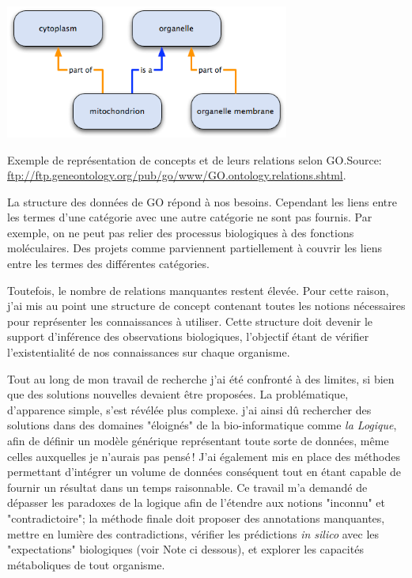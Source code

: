 \begin{refsegment}
\begin{shadedfigure}[H]
    \centering
    \includegraphics[width=0.7\textwidth]{img/dag_go_relation.png}
    \caption{Exemple de représentation de concepts et de leurs relations selon \gls{GO}.\hspace{\textwidth}\tiny{Source: \url{ftp://ftp.geneontology.org/pub/go/www/GO.ontology.relations.shtml}.}}
    \label{fig:go_relation}
\end{shadedfigure}


La structure des données de \gls{GO} répond à nos besoins. Cependant les liens entre les termes d'une catégorie avec une autre catégorie ne sont pas fournis. Par exemple, on ne peut pas relier des processus biologiques à des fonctions moléculaires. Des projets comme \cite{AdditionalGO2006} parviennent partiellement à couvrir les liens  entre les termes des différentes catégories.

Toutefois, le nombre de relations manquantes restent élevée. Pour cette raison, j'ai mis au point une structure de concept contenant toutes les notions nécessaires pour représenter les connaissances à utiliser. Cette structure doit devenir le support d'inférence des observations biologiques, l'objectif étant de vérifier l'existentialité de nos connaissances sur chaque organisme.

Tout au long de mon travail de recherche j'ai été confronté à des limites, si bien que des solutions nouvelles devaient être proposées. La problématique, d'apparence simple, s'est révélée plus complexe. j'ai ainsi dû rechercher des solutions dans des domaines "éloignés" de la bio-informatique comme \textit{la Logique}, afin de définir un modèle générique représentant toute sorte de données, même celles auxquelles je n'aurais pas pensé ! J'ai également mis en place des méthodes permettant d'intégrer un volume de données conséquent tout en étant capable de fournir un résultat dans un temps raisonnable. Ce travail m'a demandé de dépasser les paradoxes de la logique afin de l'étendre aux notions "inconnu" et "contradictoire"; la méthode finale doit proposer des annotations manquantes, mettre en lumière des contradictions, vérifier les prédictions \textit{in silico} avec les "expectations" biologiques (voir Note ci dessous), et explorer les capacités métaboliques de tout organisme.


\end{refsegment}
